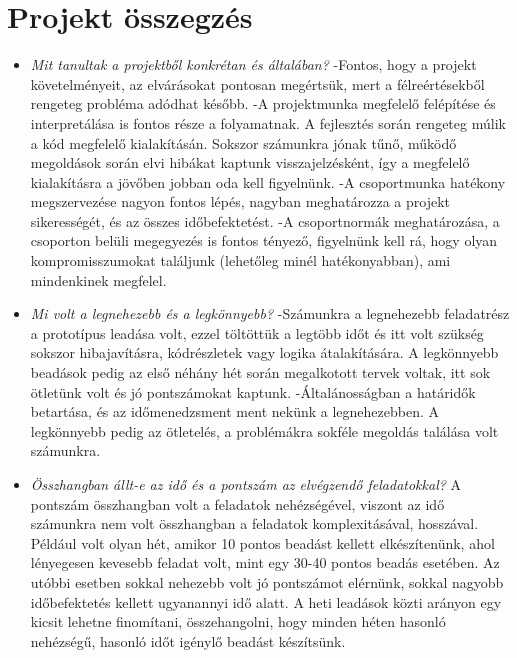 \documentclass[../../projlab]{subfiles}
\begin{document}
\section{Projekt összegzés}
\begin{itemize}
\item \textit{Mit tanultak a projektből konkrétan és általában?} \newline
    -Fontos, hogy a projekt követelményeit, az elvárásokat pontosan megértsük, mert a félreértésekből rengeteg probléma adódhat később. 
    -A projektmunka megfelelő felépítése és interpretálása is fontos része a folyamatnak. A fejlesztés során rengeteg múlik a kód megfelelő kialakításán. Sokszor számunkra jónak tűnő, működő megoldások során elvi hibákat kaptunk visszajelzésként, így a megfelelő kialakításra a jövőben jobban oda kell figyelnünk. 
    -A csoportmunka hatékony megszervezése nagyon fontos lépés, nagyban meghatározza a projekt sikerességét, és az összes időbefektetést. 
    -A csoportnormák meghatározása, a csoporton belüli megegyezés is fontos tényező, figyelnünk kell rá, hogy olyan kompromisszumokat találjunk (lehetőleg minél hatékonyabban), ami mindenkinek megfelel.  
\item \textit{Mi volt a legnehezebb és a legkönnyebb?} \newline
    -Számunkra a legnehezebb feladatrész a prototípus leadása volt, ezzel töltöttük a legtöbb időt és itt volt szükség sokszor hibajavításra, kódrészletek vagy logika átalakítására. A legkönnyebb beadások pedig az első néhány hét során megalkotott tervek voltak, itt sok ötletünk volt és jó pontszámokat kaptunk. 
    -Általánosságban a határidők betartása, és az időmenedzsment ment nekünk a legnehezebben. A legkönnyebb pedig az ötletelés, a problémákra sokféle megoldás találása volt számunkra.
\item \textit{Összhangban állt-e az idő és a pontszám az elvégzendő feladatokkal?} \newline
    A pontszám összhangban volt a feladatok nehézségével, viszont az idő számunkra nem volt összhangban a feladatok komplexitásával, hosszával. Például volt olyan hét, amikor 10 pontos beadást kellett elkészítenünk, ahol lényegesen kevesebb feladat volt, mint egy 30-40 pontos beadás esetében. Az utóbbi esetben sokkal nehezebb volt jó pontszámot elérnünk, sokkal nagyobb időbefektetés kellett ugyanannyi idő alatt. A heti leadások közti arányon egy kicsit lehetne finomítani, összehangolni, hogy minden héten hasonló nehézségű, hasonló időt igénylő beadást készítsünk. 

\end{itemize}
\end{document}

